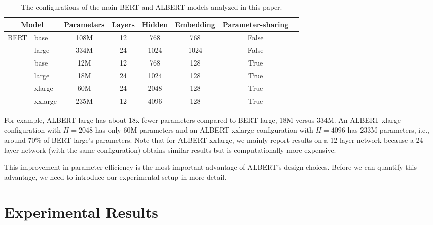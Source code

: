 \begin{table}
\small
\centering
\begin{tabular}{l  l | c c c c c c}
 \multicolumn{2}{c}{Model}          &Parameters	&Layers &Hidden &Embedding  &Parameter-sharing \\
\hline
\multirow{3}{*}{BERT}    & base	    &108M    &12 & 768  & 768  & False\\
                         & large	&334M	 &24 & 1024 & 1024 & False\\
    \hline
\multirow{4}{*}{ALBERT}  &base	    &12M     &12 & 768  & 128  & True \\
                         &large	    &18M	 &24 & 1024 & 128  & True\\
                         &xlarge	&60M	 &24 & 2048 & 128  & True\\
                         &xxlarge	&235M	 &12 & 4096 & 128  & True\\
\end{tabular}
\caption{The configurations of the main BERT and ALBERT models analyzed in this paper.}
\label{table:model_architecture}
\end{table}

For example, ALBERT-large has about 18x fewer parameters compared to BERT-large, 18M versus 334M.
An ALBERT-xlarge configuration with $H=2048$ has only 60M parameters and an ALBERT-xxlarge configuration with $H=4096$ has 233M parameters, i.e., around 70\% of BERT-large's parameters.
Note that for ALBERT-xxlarge, we mainly report results on a 12-layer network because a 24-layer network (with the same configuration) obtains similar results but is computationally more expensive.

This improvement in parameter efficiency is the most important advantage of ALBERT's design choices. 
Before we can quantify this advantage, we need to introduce our experimental setup in more detail.


\section{Experimental Results}

